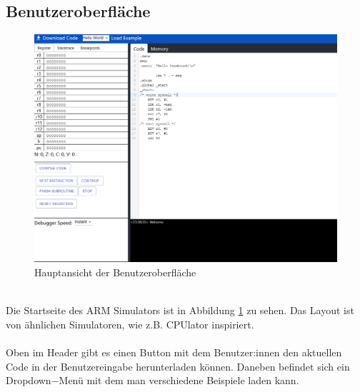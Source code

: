 \documentclass[a4paper, 11pt, onecolumn]{article}
\begin{document}
\subsection{Benutzeroberfläche}

\begin{figure}[!htb]
\centering
\includegraphics[width=1\textwidth]{data/ui}
\caption[Benutzeroberfläche]{Hauptansicht der Benutzeroberfläche}
\label{fig:ui}
\end{figure}
~\\
Die Startseite des ARM Simulators ist in Abbildung \ref{fig:ui} zu sehen. Das Layout ist von ähnlichen Simulatoren, wie z.B. CPUlator \cite{cpulator} inspiriert.\\ \\
Oben im Header gibt es einen Button mit dem Benutzer:innen den aktuellen Code in der Benutzereingabe herunterladen können. Daneben befindet sich ein Dropdown$-$Menü mit dem man verschiedene Beispiele laden kann.
\end{document}
